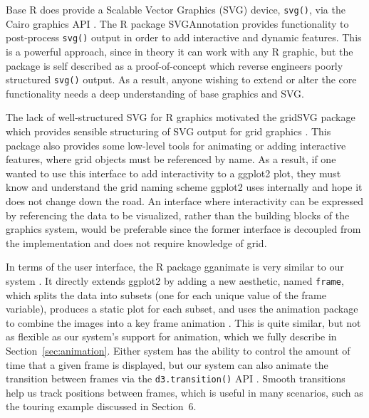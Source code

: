 \documentclass[journal]{vgtc}\usepackage[]{graphicx}\usepackage[]{color}
\begin{document}
Base R does provide a Scalable Vector Graphics (SVG) device, \texttt{svg()}, 
via the Cairo graphics API \citep{cairo}. The R package SVGAnnotation 
\citep{SVGAnnotation} provides functionality to post-process \texttt{svg()} 
output in order to add interactive and dynamic features. This is a powerful 
approach, since in theory it can work with any R graphic, but the package is 
self described as a proof-of-concept which reverse engineers poorly structured
\texttt{svg()} output. As a result, anyone wishing to extend or alter the 
core functionality needs a deep understanding of base graphics and SVG. 

The lack of well-structured SVG for R graphics motivated the gridSVG package 
which provides sensible structuring of SVG output for grid graphics 
\citep{gridSVG}. This package also provides some low-level tools for animating 
or adding interactive features, where grid objects must be referenced by name.
As a result, if one wanted to use this interface to add interactivity to a 
ggplot2 plot, they must know and understand the grid naming scheme ggplot2 uses 
internally and hope it does not change down the road. An interface where 
interactivity can be expressed by referencing the data to be visualized, 
rather than the building blocks of the graphics system, would be preferable 
since the former interface is decoupled from the implementation and does not 
require knowledge of grid.

In terms of the user interface, the R package gganimate is very similar to our
system \citep{gganimate}. It directly extends ggplot2 by adding a new aesthetic,
named \texttt{frame}, which splits the data into subsets (one for each unique 
value of the frame variable), produces a static plot for each subset, and uses
the animation package to combine the images into a key frame animation 
\citep{animation}. This is quite similar, but not as flexible as our system's
support for animation, which we fully describe in Section~\ref{sec:animation}.
Either system has the ability to control the amount of time that a given frame 
is displayed, but our system can also animate the transition between frames via
the \texttt{d3.transition()} API \citep{d3}. Smooth transitions help us track
positions between frames, which is useful in many scenarios, such as the 
touring example discussed in Section~6.
\end{document}
